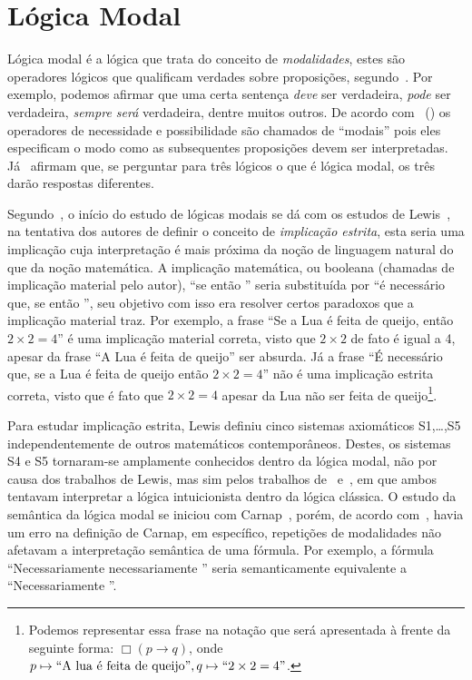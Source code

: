 \chapter{Lógica Modal}
    \label{cap:LogicaModal}

    Lógica modal é a lógica que trata do conceito de \textit{modalidades}, estes são operadores lógicos que qualificam
    verdades sobre proposições, segundo~.
    Por exemplo, podemos afirmar que uma certa sentença \textit{deve} ser verdadeira, \textit{pode} ser verdadeira,
    \textit{sempre será} verdadeira, dentre muitos outros. De acordo com~ (\citeyear{zalta1995basic}) os operadores de necessidade e possibilidade são chamados de
    ``modais'' pois eles especificam o modo como as subsequentes proposições devem ser interpretadas.
    Já~ afirmam que, se perguntar para três lógicos o que é lógica modal, os três darão respostas diferentes.

    Segundo~, o início do estudo de lógicas modais se dá com os estudos de Lewis~\cite{lewis1918survey,lewis1959symbolic},
    na tentativa dos autores de definir o conceito de \textit{implicação estrita}, esta
    seria uma implicação cuja interpretação é mais próxima da noção de linguagem natural do que da noção matemática. A implicação matemática, ou booleana
    (chamadas de implicação material pelo autor), ``se \PHI então \PSI'' seria substituída por ``é necessário que, se \PHI então \PSI'', seu
    objetivo com isso era resolver certos paradoxos que a implicação material traz. Por exemplo, a frase ``Se a Lua é feita de queijo, então \(2 \times 2 = 4\)''
    é uma implicação material correta, visto que \(2 \times 2\) de fato é igual a 4, apesar da frase ``A Lua é feita de queijo'' ser absurda. Já a frase
    ``É necessário que, se a Lua é feita de queijo então \(2 \times 2 = 4\)'' não é uma implicação estrita correta, visto que é fato que \(2 \times 2 = 4\)
    apesar da Lua não ser feita de queijo\footnote{Podemos representar essa frase na notação que será apresentada à frente da seguinte forma:
    \(\Box(p \to q)\), onde \(p \mapsto \text{``A lua é feita de queijo''}, q \mapsto ``2 \times 2 = 4\text{''}\).}.

    Para estudar implicação estrita, Lewis definiu cinco sistemas axiomáticos S1,\ldots,S5 independentemente de outros matemáticos contemporâneos.
    Destes, os sistemas S4 e S5 tornaram-se amplamente conhecidos dentro da lógica modal, não por causa dos trabalhos de Lewis, mas sim pelos trabalhos
    de~ e~, em que ambos tentavam interpretar a lógica intuicionista dentro da lógica clássica.
    O estudo da semântica da lógica modal se iniciou com Carnap~\cite{carnap1942introduction}, porém, de acordo com~, havia
    um erro na definição de Carnap, em específico, repetições de modalidades não afetavam a interpretação semântica de uma fórmula. Por exemplo, a fórmula
    ``Necessariamente necessariamente \PHI'' seria semanticamente equivalente a ``Necessariamente \PHI''.

